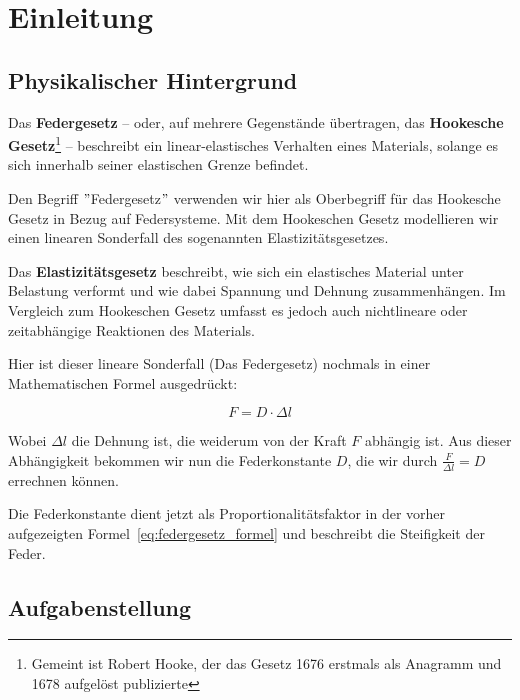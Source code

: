 \documentclass[../main.tex]{subfiles} %
\begin{document}
\chapter{Einleitung}\label{ch:einleitung}


    \section{Physikalischer Hintergrund}\label{sec:physikalischer-hintergrund}

        Das \textbf{Federgesetz} – oder, auf mehrere Gegenstände übertragen, das \textbf{Hookesche Gesetz}\footnote{Gemeint ist Robert Hooke, der das Gesetz 1676 erstmals als Anagramm und 1678 aufgelöst publizierte} – beschreibt ein linear-elastisches Verhalten eines Materials, solange es sich innerhalb seiner elastischen Grenze befindet.

        Den Begriff \("\)Federgesetz\("\) verwenden wir hier als Oberbegriff für das Hookesche Gesetz in Bezug auf Federsysteme.
        Mit dem Hookeschen Gesetz modellieren wir einen linearen Sonderfall des sogenannten Elastizitätsgesetzes.

        \begin{tcolorbox}[title=Ausholung für das Elastizitätsgesetz]
            Das \textbf{Elastizitätsgesetz} beschreibt, wie sich ein elastisches Material unter Belastung verformt und wie dabei Spannung und Dehnung zusammenhängen.
            Im Vergleich zum Hookeschen Gesetz umfasst es jedoch auch nichtlineare oder zeitabhängige Reaktionen des Materials.
        \end{tcolorbox}

        Hier ist dieser lineare Sonderfall (Das Federgesetz) nochmals in einer Mathematischen Formel ausgedrückt:

        \begin{equation}
            F = D \cdot \Delta l
        \label{eq:federgesetz_formel}
        \end{equation}

        Wobei ${\Delta l}$ die Dehnung ist, die weiderum von der Kraft ${F}$ abhängig ist.
        Aus dieser Abhängigkeit bekommen wir nun die Federkonstante ${D}$, die wir durch ${\frac{F}{\Delta l} = D}$ errechnen können.

        Die Federkonstante dient jetzt als Proportionalitätsfaktor in der vorher aufgezeigten Formel~\ref{eq:federgesetz_formel} und beschreibt die Steifigkeit der Feder.


    \section{Aufgabenstellung}\label{sec:aufgabenstellung}
\end{document}
